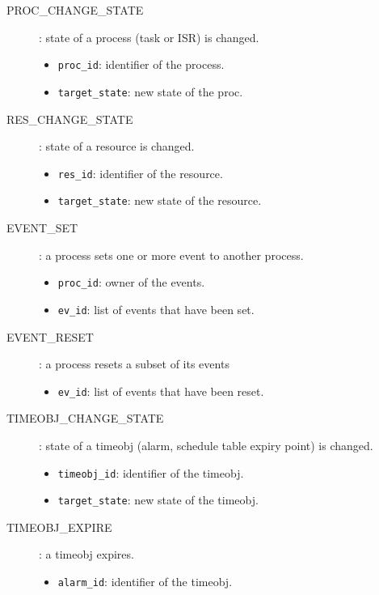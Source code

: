 \begin{description}
  \item[PROC\_CHANGE\_STATE]: state of a process (task or ISR) is changed.
    \begin{itemize}
      \item \texttt{proc_id}: identifier of the process.
      \item \texttt{target_state}: new state of the proc. %
    \end{itemize}

  \item[RES\_CHANGE\_STATE]: state of a resource is changed.
    \begin{itemize}
      \item \texttt{res_id}: identifier of the resource.
      \item \texttt{target_state}: new state of the resource. %
    \end{itemize}

  \item[EVENT_SET]: a process sets one or more event to another process.
    \begin{itemize}
      \item \texttt{proc_id}: owner of the events.
      \item \texttt{ev_id}: list of events that have been set.
    \end{itemize}

  \item[EVENT_RESET]: a process resets a subset of its events
    \begin{itemize}
      \item \texttt{ev_id}: list of events that have been reset.
    \end{itemize}

  \item[TIMEOBJ\_CHANGE\_STATE]: state of a timeobj (alarm, schedule table
    expiry point) is changed.
    \begin{itemize}
      \item \texttt{timeobj_id}: identifier of the timeobj.
      \item \texttt{target_state}: new state of the timeobj.
    \end{itemize}

  \item[TIMEOBJ\_EXPIRE]: a timeobj expires.
    \begin{itemize}
      \item \texttt{alarm_id}: identifier of the timeobj.
    \end{itemize}

\end{description}

